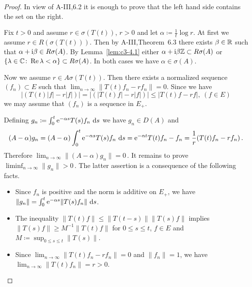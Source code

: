 \begin{proof}
In view of A-III,6.2 it is enough to prove that the left hand
side contains the set on the right.

Fix $t > 0$ and assume $r \in \sigma(T(t))$, $r > 0$ and let $\alpha \coloneqq \frac{1}{t} \log r$.
At first we assume $r \in R(\sigma(T(t)))$.
Then by A-III,Theorem~6.3 there exists
$\beta \in \mathbb{R} $ such that $\alpha+\mathrm{i}\beta \in R\sigma(A)$.
By Lemma~\ref{lem:c3-4.1} either $\alpha+\mathrm{i}\beta\mathbb{Z} \subset R\sigma(A)$
or $\{\lambda \in \mathbb{C}  \colon \mathop{}\!\mathrm{Re}\, \lambda < \alpha\} \subset R\sigma(A)$.
In both cases we have $\alpha \in \sigma(A)$.

Now we assume $r \in A\sigma(T(t))$.
Then there exists a normalized sequence
$(f_n) \subset E$ such that $\lim_{n \to \infty}\|T(t)f_n - rf_n\| = 0$.
Since we have
\[
|(T(t)|f| - r|f|)| = |(|T(t)f| - r|f|)| \leq |T(t)f - rf|, \  (f \in E) 
\]
we may assume that $(f_n)$ is a sequence in $E_+$.

Defining $g_n \coloneqq \int_{0}^{t} \mathrm{e}^{-\alpha s}T(s)f_n \, \mathop{}\!\mathrm{d}{s} $ we have $g_n \in D(A)$ and
\[
(A-\alpha)g_n = (A-\alpha)\int_{0}^{t} \mathrm{e}^{-\alpha s}T(s)f_n \, \mathop{}\!\mathrm{d}{s} = \mathrm{e}^{-\alpha t}T(t)f_n - f_n = \frac{1}{r}(T(t)f_n - rf_n)\,.
\]
Therefore $\lim_{n \to \infty}\|(A - \alpha) g_n\| = 0$\,. It remains to prove 
$\liminf_{n \to \infty}\|g_n\| > 0$\,.
The latter assertion is a consequence of the
following facts.
\begin{itemize}
	\item
	Since $f_n$ is positive and the norm is additive on $E_+$,
	we have
	\\ 
	$\|g_n\| = \int_{0}^{t} \mathrm{e}^{-\alpha s}\|T(s)f_n\| \, \mathop{}\!\mathrm{d}{s}$.
	
	\item The inequality $\|T(t)f\| \leq \|T(t-s)\|\|T(s)f\|$ implies
	$\|T(s)f\| \geq M^{-1}\|T(t)f\|$ for $0 \leq s \leq t$, $f \in E$ and $M \coloneqq \sup_{0 \leq s \leq t}\|T(s)\|$.
	 
	 \item 
	 Since $\lim_{n \to \infty}\|T(t)f_n - rf_n\| = 0$ and $\|f_n\| = 1$, we have
	 \\
	 $\lim_{n \to \infty}\|T(t)f_n\| = r > 0$.
\end{itemize}
\end{proof}
%

